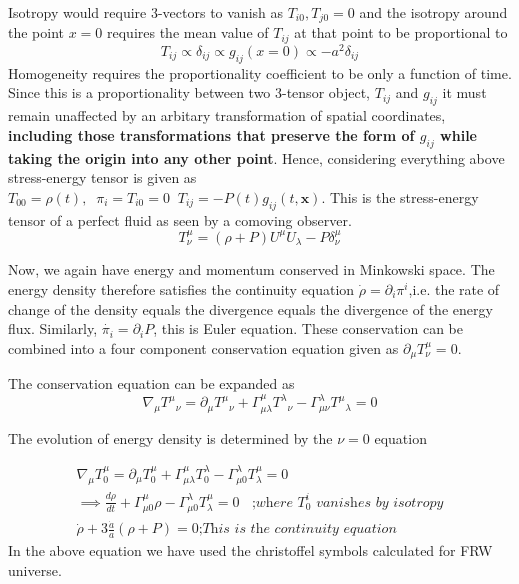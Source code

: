 \documentclass[12pt]{report}
\newcommand{\mbf}[1]{\mathbf{#1}}
\newcommand{\tit}[1]{\textit{#1}}
\newcommand{\de}[2]{\frac{d{#1}}{d{#2}}}
\newcommand{\ch}[2]{\Gamma^{#1}_{#2}}
\newcommand{\p}{\partial}
\begin{document}
Isotropy would require 3-vectors to vanish as $T_{i0},T_{j0}=0$ and the isotropy around the point $x=0$ requires the mean value of $T_{ij}$ at that point to be proportional to 
\begin{equation}
T_{ij} \propto \delta_{ij} \propto g_{ij}(x=0) \propto -a^2\delta_{ij}
\end{equation}
Homogeneity requires the proportionality coefficient to be only a function  of time. Since this is a proportionality between two 3-tensor  object, $T_{ij}$ and $g_{ij}$ it must remain unaffected by an arbitary transformation of spatial coordinates, \textbf{including those transformations that preserve the form of $g_{ij}$ while taking the origin into any other point}. Hence, considering everything above stress-energy tensor is given as $T_{00}=\rho(t), \; \; \pi_i=T_{i0}=0 \; \; T_{ij}= -P(t)g_{ij}(t,\mbf{x})$. This is the stress-energy tensor of a perfect fluid as seen by a comoving observer.
\begin{equation}\label{step}
T^\mu_\nu=(\rho+P)U^\mu U_\lambda - P \delta^\mu _\nu
\end{equation}

Now, we again have energy and momentum conserved in Minkowski space. The energy density therefore satisfies the continuity equation $\dot{\rho}=\p_i \pi^i$,i.e. the rate of change of the density equals the divergence equals the divergence of the energy flux. Similarly, $\dot{\pi_i}=\p_i P$, this is Euler equation. These conservation can be combined into a four component conservation equation given as $\p_\mu T^\mu _\nu=0$. 

The conservation equation can be expanded as 
\begin{equation*}
\nabla_\mu {T^\mu}_\nu = \p_\mu {T^\mu} _\nu + \ch{\mu}{\mu \lambda} {T^\lambda} _\nu - \ch{\lambda}{\mu \nu} {T^\mu} _\lambda=0
\end{equation*}

The evolution of energy density is determined by the $\nu=0$ equation

\begin{eqnarray*}
\nabla_\mu T^\mu _0 = \p_\mu T^\mu _0 + \ch{\mu}{\mu \lambda} T^\lambda _0 - \ch{\lambda}{\mu 0} T^\mu _\lambda=0 \\
\implies \de{\rho}{t} + \ch{\mu}{\mu 0} \rho - \ch{\lambda}{\mu 0} T^\mu _\lambda=0 \; \; \tit{ ;where $T^i_0$ vanishes by isotropy}\\
\dot{\rho}+ 3 \frac{\dot{a}}{a}(\rho + P) = 0 \tit{;This is the continuity equation}
\end{eqnarray*}
In the above equation we have used the christoffel symbols calculated for FRW universe. 
\end{document}
